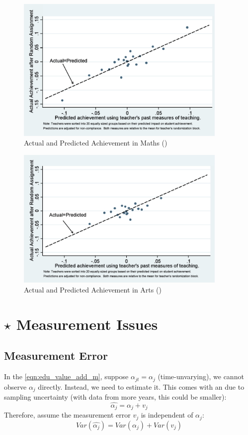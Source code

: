         \begin{figure}[H]
            \centering
            \includegraphics[width=4in]{images/ch9/9 kane math.png}
            \caption{Actual and Predicted Achievement in Maths (\cite{kane_have_2013})}
        \end{figure}
        \begin{figure}[H]
            \centering
            \includegraphics[width=4in]{images/ch9/9 kane arts.png}
            \caption{Actual and Predicted Achievement in Arts (\cite{kane_have_2013})}
        \end{figure}
        
\section{$\star$ Measurement Issues}

    \subsection{Measurement Error}

        In the \ref{eqn:edu_value_add_m}, suppose $\alpha_{jt}=\alpha_{j}$ (time-unvarying), we cannot observe $\alpha_j$ directly. Instead, we need to estimate it. This comes with an  due to sampling uncertainty (with data from more years, this could be smaller):
        $$\widehat{\alpha_j}=\alpha_j + v_j$$
        Therefore, assume the measurement error $v_j$ is independent of $\alpha_j$:
        $$Var(\widehat{\alpha_j})=Var(\alpha_j)+Var(v_j)$$
        
